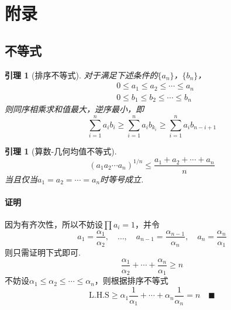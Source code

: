 \documentclass[12pt, a4paper]{article}
\theoremstyle{margin}
\newtheorem{lemma}[thm]{引理}
\newcommand{\lhs}{\text{L.H.S}}
\newcommand{\proof}{\paragraph{证明}}
\begin{document}
\newpage
\section{附录}
\subsection{不等式}

  \begin{lemma}[排序不等式]
    \label{lemma: 排序不等式}
    对于满足下述条件的$\{a_n\}$，$\{b_n\}$，
    \[\begin{split}
      & 0 \le a_1\le a_2\le\cdots\le a_n \\
      & 0 \le b_1\le b_2\le\cdots\le b_n
    \end{split}\]
    则同序相乘求和值最大，逆序最小，即
    \[
      \sum_{i=1}^n a_ib_i \ge \sum_{i=1}^n a_ib_{k_i}
      \ge \sum_{i=1}^n a_ib_{n-i+1}
    \]
  \end{lemma}

  \begin{lemma}[算数-几何均值不等式]
    \[
      (a_1a_2\cdots a_n)^{1/n} \le \frac{a_1+a_2+\cdots+a_n}{n}
    \]
    当且仅当$a_1 = a_2 = \cdots = a_n$时等号成立.
  \end{lemma}
  \proof
    因为有齐次性，所以不妨设$\prod a_i=1$，并令
    \[
      a_1=\frac{\alpha_1}{\alpha_2},\quad
      \dots,\quad
      a_{n-1} = \frac{\alpha_{n-1}}{\alpha_n},\quad
      a_n = \frac{\alpha_n}{\alpha_1}
    \]
    则只需证明下式即可.
    \[
      \frac{\alpha_1}{\alpha_2} + \cdots + \frac{\alpha_n}{\alpha_1}
      \ge n
    \]
    不妨设$\alpha_1 \le \alpha_2 \le \cdots \le \alpha_n$，则根据排序不等式
    \[
      \lhs \ge \alpha_1\frac{1}{\alpha_1} + \cdots + \alpha_n\frac{1}{\alpha_n}
       = n \quad\blacksquare
    \]
\end{document}
